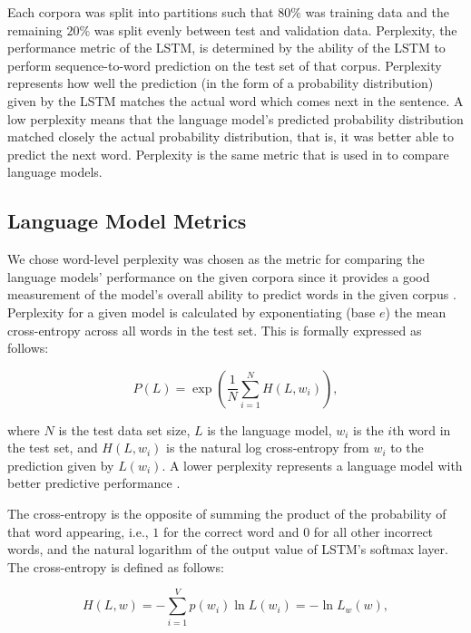 \documentclass[runningheads,a4paper]{llncs}
\begin{document}

Each corpora was split into partitions such that $80\%$ was training data
and the remaining $20\%$ was split evenly between test and validation
data. Perplexity, the performance metric of the LSTM, is determined by the
ability of the LSTM to perform sequence-to-word prediction on the test
set of that corpus. Perplexity represents how well the prediction (in the
form of a probability distribution) given by the LSTM matches the actual
word which comes next in the sentence. A low perplexity means that the
language model's predicted probability distribution matched closely the
actual probability distribution, that is, it was better able to predict
the next word. Perplexity is the same metric that is used in
\citet{LSTMArticle} to compare language models.

\subsection{Language Model Metrics}

We chose word-level perplexity was chosen as the metric for comparing the
language models' performance on the given corpora since it provides
a good measurement of the model's overall ability to predict words
in the given corpus \cite{sundermeyer2015feedforward}. 
Perplexity for a given model is calculated
by exponentiating (base $e$) the mean
cross-entropy across all words in the test set. This is formally
expressed as follows:

\begin{equation}
\label{perplexity}
    P(L) = \exp\left(\frac{1}{N}\sum^{N}_{i=1} H(L,w_i)\right) ,
\end{equation}

where $N$ is the test data set size, $L$ is the language model, $w_i$
is the $i$th word in the test set, and $H(L, w_i)$ is the natural log
cross-entropy from $w_i$ to the prediction given by $L(w_i)$. A lower
perplexity represents a language model with better predictive
performance \cite{wang2016parallel}.

The cross-entropy is the opposite of summing the
product of the probability of that word appearing, i.e., $1$ for the
correct word and $0$ for all other incorrect words, and the
natural logarithm of the output value of LSTM's softmax layer.
The cross-entropy is defined as follows:

\begin{equation}
\label{cross-entropy}
    H(L,w) = - \sum_{i=1}^V p(w_i) \ln L(w_i) = - \ln L_w(w) ,
\end{equation}
\end{document}
